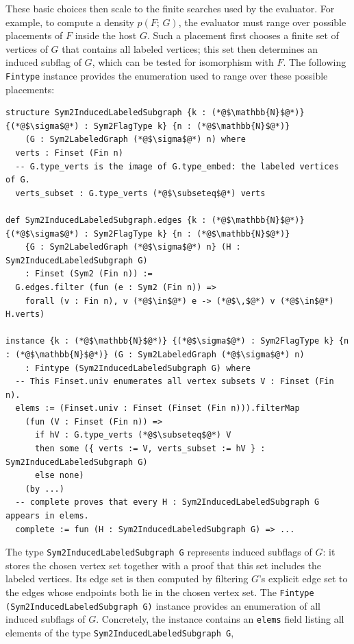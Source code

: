 \documentclass{article}
\newcommand{\den}[2]{p(#1;\,#2)}
\newcommand{\lean}[1]{\texttt{#1}}
\begin{document}
These basic choices then scale to the finite searches used by the evaluator.
For example, to compute a density \(\den{F}{G}\),
the evaluator must range over possible placements of \(F\)
inside the host \(G\).  Such a placement first chooses a finite set of vertices
of \(G\) that contains all labeled vertices; this set then determines an
induced subflag of \(G\), which can be tested for isomorphism with \(F\).
The following \lean{Fintype} instance provides the enumeration used to range
over these possible placements:
\begin{lstlisting}
structure Sym2InducedLabeledSubgraph {k : (*@$\mathbb{N}$@*)} {(*@$\sigma$@*) : Sym2FlagType k} {n : (*@$\mathbb{N}$@*)}
    (G : Sym2LabeledGraph (*@$\sigma$@*) n) where
  verts : Finset (Fin n)
  -- G.type_verts is the image of G.type_embed: the labeled vertices of G.
  verts_subset : G.type_verts (*@$\subseteq$@*) verts

def Sym2InducedLabeledSubgraph.edges {k : (*@$\mathbb{N}$@*)} {(*@$\sigma$@*) : Sym2FlagType k} {n : (*@$\mathbb{N}$@*)}
    {G : Sym2LabeledGraph (*@$\sigma$@*) n} (H : Sym2InducedLabeledSubgraph G)
    : Finset (Sym2 (Fin n)) :=
  G.edges.filter (fun (e : Sym2 (Fin n)) =>
    forall (v : Fin n), v (*@$\in$@*) e -> (*@$\,$@*) v (*@$\in$@*) H.verts)

instance {k : (*@$\mathbb{N}$@*)} {(*@$\sigma$@*) : Sym2FlagType k} {n : (*@$\mathbb{N}$@*)} (G : Sym2LabeledGraph (*@$\sigma$@*) n)
    : Fintype (Sym2InducedLabeledSubgraph G) where
  -- This Finset.univ enumerates all vertex subsets V : Finset (Fin n).
  elems := (Finset.univ : Finset (Finset (Fin n))).filterMap
    (fun (V : Finset (Fin n)) =>
      if hV : G.type_verts (*@$\subseteq$@*) V
      then some ({ verts := V, verts_subset := hV } : Sym2InducedLabeledSubgraph G)
      else none)
    (by ...)
  -- complete proves that every H : Sym2InducedLabeledSubgraph G appears in elems.
  complete := fun (H : Sym2InducedLabeledSubgraph G) => ...
\end{lstlisting}
The type \lean{Sym2InducedLabeledSubgraph G} represents induced subflags
of \(G\): it stores the chosen vertex set together with a proof that this set
includes the labeled vertices.  Its edge set is then computed by filtering
\(G\)'s explicit edge set to the edges whose endpoints both lie in the
chosen vertex set.  The \lean{Fintype (Sym2InducedLabeledSubgraph G)} instance
provides an enumeration of all induced subflags of \(G\).  Concretely,
the instance contains an \lean{elems} field listing all elements of the type \lean{Sym2InducedLabeledSubgraph~G},
\end{document}
